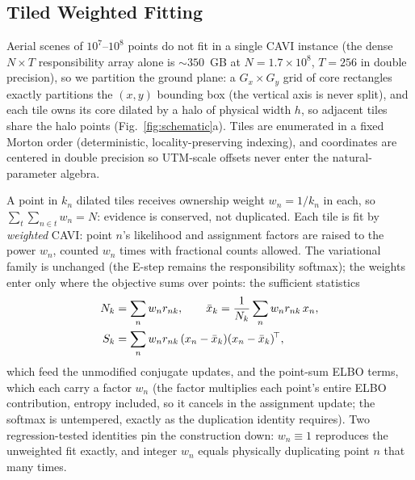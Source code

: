 \subsection{Tiled Weighted Fitting}
\label{sec:tiled-fit}

Aerial scenes of $10^7$--$10^8$ points do not fit in a single CAVI
instance (the dense $N \times T$ responsibility array alone is
${\sim}350$~GB at $N{=}1.7\times10^{8}$, $T{=}256$ in double
precision), so we partition the ground plane: a $G_x \times G_y$ grid of
core rectangles exactly partitions the $(x,y)$ bounding box
(the vertical axis is never split), and each tile owns its core
dilated by a halo of physical width $h$, so adjacent tiles share the
halo points (Fig.~\ref{fig:schematic}a). Tiles are enumerated in a
fixed Morton order (deterministic, locality-preserving indexing), and
coordinates are centered in double precision so UTM-scale offsets
never enter the natural-parameter algebra.

 A point in $k_n$ dilated tiles receives ownership weight
$w_n = 1/k_n$ in each, so
$\sum_t \sum_{n \in t} w_n = N$: evidence is conserved, not
duplicated. Each tile is fit by \emph{weighted} CAVI: point $n$'s
likelihood and assignment factors are raised to the power $w_n$,
counted $w_n$ times with fractional counts allowed. The variational family
is unchanged (the E-step remains the responsibility softmax);
the weights enter only where the objective sums over points: the
sufficient statistics
\begin{align}
N_k &= \sum_n w_n r_{nk}, \qquad
\bar{x}_k = \frac{1}{N_k}\sum_n w_n r_{nk}\, x_n, \notag \\
S_k &= \sum_n w_n r_{nk}\, (x_n - \bar{x}_k)(x_n - \bar{x}_k)^{\!\top},
\label{eq:wstats}
\end{align}
which feed the unmodified conjugate updates, and the point-sum ELBO
terms, which each carry a factor $w_n$ (the factor multiplies each
point's entire ELBO contribution, entropy included, so it cancels in
the assignment update; the softmax is untempered, exactly as the
duplication identity requires). Two regression-tested
identities pin the construction down: $w_n \equiv 1$
reproduces the unweighted fit exactly, and integer $w_n$ equals
physically duplicating point $n$ that many times.

